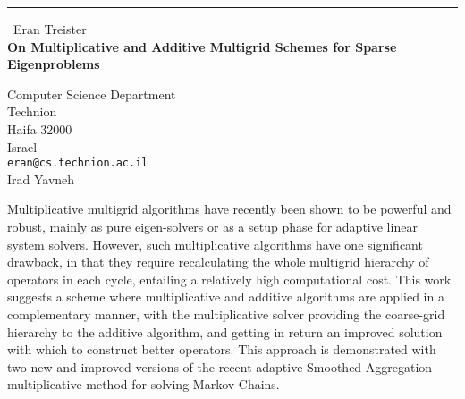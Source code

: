 \documentclass{report}
\begin{document}
\begin{center}
\rule{6in}{1pt} \
{\large Eran Treister \\
{\bf On Multiplicative and Additive Multigrid Schemes for Sparse Eigenproblems}}

Computer Science Department \\ Technion \\ Haifa 32000 \\ Israel
\\
{\tt eran@cs.technion.ac.il}\\
Irad Yavneh\end{center}

Multiplicative multigrid algorithms have recently been shown to be
powerful and robust, mainly as pure eigen-solvers or as a setup phase for
adaptive linear system solvers. However, such multiplicative algorithms
have one significant drawback, in that
they require recalculating the whole multigrid hierarchy of operators in
each cycle, entailing a relatively high computational cost. This work
suggests a scheme where multiplicative
and additive algorithms are applied in a complementary manner, with the
multiplicative solver providing the coarse-grid hierarchy to the additive
algorithm, and getting in return an improved solution with which to
construct better operators. This approach is demonstrated with two new
and improved versions of the recent adaptive Smoothed Aggregation
multiplicative method for solving Markov Chains.
\end{document}
